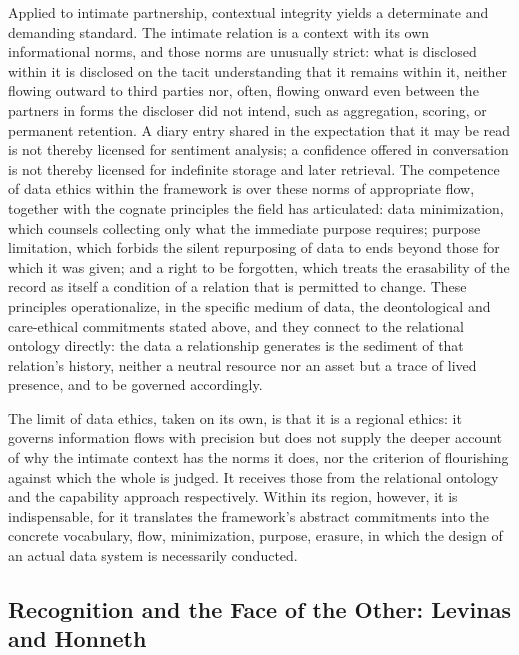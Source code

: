 \documentclass[11pt,a4paper]{article}
\begin{document}
Applied to intimate partnership, contextual integrity yields a determinate and demanding standard. The intimate relation is a context with its own informational norms, and those norms are unusually strict: what is disclosed within it is disclosed on the tacit understanding that it remains within it, neither flowing outward to third parties nor, often, flowing onward even between the partners in forms the discloser did not intend, such as aggregation, scoring, or permanent retention. A diary entry shared in the expectation that it may be read is not thereby licensed for sentiment analysis; a confidence offered in conversation is not thereby licensed for indefinite storage and later retrieval. The competence of data ethics within the framework is over these norms of appropriate flow, together with the cognate principles the field has articulated: data minimization, which counsels collecting only what the immediate purpose requires; purpose limitation, which forbids the silent repurposing of data to ends beyond those for which it was given; and a right to be forgotten, which treats the erasability of the record as itself a condition of a relation that is permitted to change. These principles operationalize, in the specific medium of data, the deontological and care-ethical commitments stated above, and they connect to the relational ontology directly: the data a relationship generates is the sediment of that relation's history, neither a neutral resource nor an asset but a trace of lived presence, and to be governed accordingly.

The limit of data ethics, taken on its own, is that it is a regional ethics: it governs information flows with precision but does not supply the deeper account of why the intimate context has the norms it does, nor the criterion of flourishing against which the whole is judged. It receives those from the relational ontology and the capability approach respectively. Within its region, however, it is indispensable, for it translates the framework's abstract commitments into the concrete vocabulary, flow, minimization, purpose, erasure, in which the design of an actual data system is necessarily conducted.

\subsection{Recognition and the Face of the Other: Levinas and Honneth}\label{p01:sec:recognition}
\end{document}
